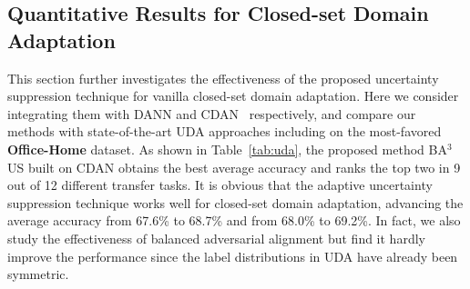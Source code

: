\documentclass[runningheads]{llncs}
\begin{document}
\subsection{Quantitative Results for Closed-set Domain Adaptation} 
This section further investigates the effectiveness of the proposed uncertainty suppression technique for vanilla closed-set domain adaptation.
Here we consider integrating them with DANN and CDAN~\cite{long2018conditional} respectively, and compare our methods with state-of-the-art UDA approaches including \cite{wang2019transferable,xu2019unsupervised} on the most-favored \textbf{Office-Home} dataset.
As shown in Table~\ref{tab:uda}, the proposed method BA$^3$US built on CDAN obtains the best average accuracy and ranks the top two in 9 out of 12 different transfer tasks.
It is obvious that the adaptive uncertainty suppression technique works well for closed-set domain adaptation, advancing the average accuracy from 67.6\% to 68.7\% and from 68.0\% to 69.2\%.
In fact, we also study the effectiveness of balanced adversarial alignment but find it hardly improve the performance since the label distributions in UDA have already been symmetric.
	
\end{document}
